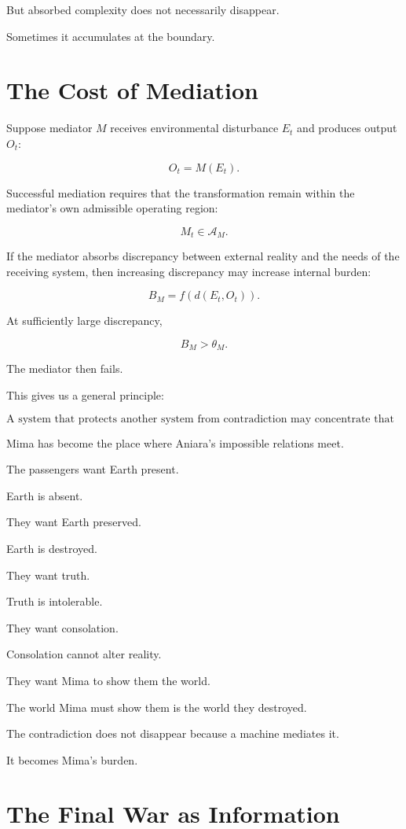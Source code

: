 \documentclass[11pt,oneside]{book}
\theoremstyle{definition}
\theoremstyle{remark}
\newcommand{\A}{\mathcal{A}}
\begin{document}
But absorbed complexity does not necessarily disappear.

Sometimes it accumulates at the boundary.

\section{The Cost of Mediation}

Suppose mediator \(M\) receives environmental disturbance \(E_t\) and produces output \(O_t\):

\[
O_t=M(E_t).
\]

Successful mediation requires that the transformation remain within the mediator's own admissible operating region:

\[
M_t\in\A_M.
\]

If the mediator absorbs discrepancy between external reality and the needs of the receiving system, then increasing discrepancy may increase internal burden:

\[
B_M
=
f\!\left(
d(E_t,O_t)
\right).
\]

At sufficiently large discrepancy,

\[
B_M>\theta_M.
\]

The mediator then fails.

This gives us a general principle:

\[
\boxed{
\text{A system that protects another system from contradiction may concentrate that contradiction within itself.}
}
\]

Mima has become the place where Aniara's impossible relations meet.

The passengers want Earth present.

Earth is absent.

They want Earth preserved.

Earth is destroyed.

They want truth.

Truth is intolerable.

They want consolation.

Consolation cannot alter reality.

They want Mima to show them the world.

The world Mima must show them is the world they destroyed.

The contradiction does not disappear because a machine mediates it.

It becomes Mima's burden.

\section{The Final War as Information}
\end{document}
